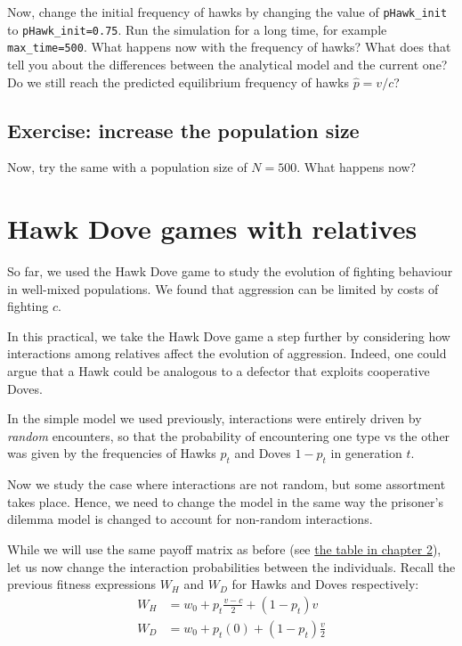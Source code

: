 \documentclass[
]{book}
\begin{document}
Now, change the initial frequency of hawks by changing the value of \texttt{pHawk\_init} to \texttt{pHawk\_init=0.75}. Run the simulation for a long time, for example \texttt{max\_time=500}. What happens now with the frequency of hawks? What does that tell you about the differences between the analytical model and the current one? Do we still reach the predicted equilibrium frequency of hawks \(\hat{p} = v/c\)?

\section{Exercise: increase the population size}\label{exercise-increase-the-population-size}

Now, try the same with a population size of \(N=500\). What happens now?

\chapter{Hawk Dove games with relatives}\label{hawk-dove-games-with-relatives}

So far, we used the Hawk Dove game to study the evolution of fighting behaviour in well-mixed populations. We found that aggression can be limited by costs of fighting \(c\).

In this practical, we take the Hawk Dove game a step further by considering how interactions among relatives affect the evolution of aggression. Indeed, one could argue that a Hawk could be analogous to a defector that exploits cooperative Doves.

In the simple model we used previously, interactions were entirely driven by \emph{random} encounters, so that the probability of encountering one type vs the other was given by the frequencies of Hawks \(p_{t}\) and Doves \(1-p_{t}\) in generation \(t\).

Now we study the case where interactions are not random, but some assortment takes place. Hence, we need to change the model in the same way the prisoner's dilemma model is changed to account for non-random interactions.

While we will use the same payoff matrix as before (see \hyperref[tab:payoffHD]{the table in chapter 2}), let us now change the interaction probabilities between the individuals. Recall the previous fitness expressions \(W_{H}\) and \(W_{D}\) for Hawks and Doves respectively:
\begin{align}
W_{H} &= w_{0} + p_{t} \frac{v-c}{2} + \left(1 - p_{t} \right) v \label{eq:wH} \\
W_{D} &= w_{0} + p_{t} (0) + \left(1 - p_{t} \right) \frac{v}{2} \label{eq:wD}\\
\end{align}
\end{document}

